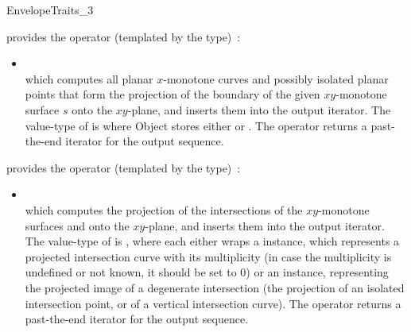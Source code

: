 \begin{ccRefConcept}{EnvelopeTraits_3}
{provides the operator (templated by the  type)~:
 \begin{itemize}
 \item {} \\
 which computes all planar $x$-monotone curves and possibly isolated planar points 
 that form the projection of the
 boundary of the given $xy$-monotone surface $s$ onto the $xy$-plane,
 and inserts them into the output iterator. 
 The value-type of  is 
 where Object stores either  or .
 The operator returns a past-the-end iterator for the output sequence.
 \end{itemize}}
 
{provides the operator (templated by the  type)~:
 \begin{itemize}
 \item {} \\
 which computes the projection of the intersections of the
 $xy$-monotone surfaces  and  onto the $xy$-plane,
 and inserts them into the output iterator.
 The value-type of  is , where
 each  either wraps a 
 instance, which represents a projected intersection curve with its
 multiplicity (in case the multiplicity is undefined or not known, it
 should be set to $0$) or an  instance, representing the
 projected image of a degenerate intersection (the projection of an
 isolated intersection point, or of a vertical intersection curve).
 The operator returns a past-the-end iterator for the output sequence.
 \end{itemize}}


\end{ccRefConcept}
